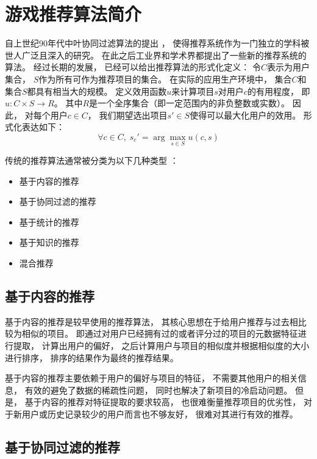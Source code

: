 \section{游戏推荐算法简介}

自上世纪90年代中叶协同过滤算法的提出
\cite{adomaviciusNextGenerationRecommender2005}，
使得推荐系统作为一门独立的学科被世人广泛且深入的研究。
在此之后工业界和学术界都提出了一些新的推荐系统的算法。
经过长期的发展，
已经可以给出推荐算法的形式化定义：
令$C$表示为用户集合，
$S$作为所有可作为推荐项目的集合。
在实际的应用生产环境中，
集合$C$和集合$S$都具有相当大的规模。
定义效用函数$u$来计算项目$s$对用户$c$的有用程度，
即$u:C\times S\rightarrow R$。
其中$R$是一个全序集合（即一定范围内的非负整数或实数）。
因此，
对每个用户$c\in C$，
我们期望选出项目$s'\in S$使得可以最大化用户的效用。
形式化表达如下：
\begin{equation}
    \forall c\in C,\; s_c'=\arg \max_{s\in S} u(c,s)
\end{equation}

传统的推荐算法通常被分类为以下几种类型
\cite{canoHybridRecommenderSystems2017}：
\begin{itemize}
    \item 基于内容的推荐
    \item 基于协同过滤的推荐
    \item 基于统计的推荐
    \item 基于知识的推荐
    \item 混合推荐
\end{itemize}

\subsection{基于内容的推荐}

基于内容的推荐是较早使用的推荐算法，
其核心思想在于给用户推荐与过去相比较为相似的项目。
即通过对用户已经拥有过的或者评分过的项目的元数据特征进行提取，
计算出用户的偏好，
之后计算用户与项目的相似度并根据相似度的大小进行排序，
排序的结果作为最终的推荐结果。

基于内容的推荐主要依赖于用户的偏好与项目的特征，
不需要其他用户的相关信息，
有效的避免了数据的稀疏性问题，
同时也解决了新项目的冷启动问题。
但是，
基于内容的推荐对特征提取的要求较高，
也很难衡量推荐项目的优劣性，
对于新用户或历史记录较少的用户而言也不够友好，
很难对其进行有效的推荐。

\subsection{基于协同过滤的推荐}

